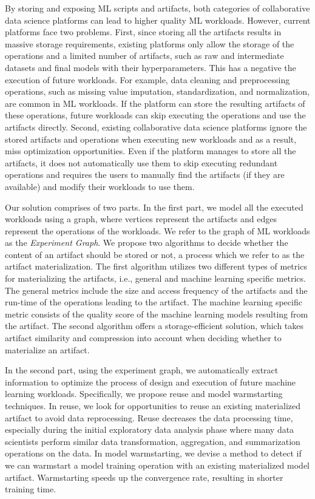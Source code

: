 By storing and exposing ML scripts and artifacts, both categories of collaborative data science platforms can lead to higher quality ML workloads.
However, current platforms face two problems.
First, since storing all the artifacts results in massive storage requirements, existing platforms only allow the storage of the operations and a limited number of artifacts, such as raw and intermediate datasets and final models with their hyperparameters.
This has a negative the execution of future workloads.
For example, data cleaning and preprocessing operations, such as missing value imputation, standardization, and normalization, are common in ML workloads.
If the platform can store the resulting artifacts of these operations, future workloads can skip executing the operations and use the artifacts directly. 
Second, existing collaborative data science platforms ignore the stored artifacts and operations when executing new workloads and as a result, miss optimization opportunities.
Even if the platform manages to store all the artifacts, it does not automatically use them to skip executing redundant operations and requires the users to manually find the artifacts (if they are available) and modify their workloads to use them.

Our solution comprises of two parts.
In the first part, we model all the executed workloads using a graph, where vertices represent the artifacts and edges represent the operations of the workloads.
We refer to the graph of ML workloads as the \textit{Experiment Graph}.
We propose two algorithms to decide whether the content of an artifact should be stored or not, a process which we refer to as the artifact materialization.
The first algorithm utilizes two different types of metrics for materializing the artifacts, i.e., general and machine learning specific metrics.
The general metrics include the size and access frequency of the artifacts and the run-time of the operations leading to the artifact.
The machine learning specific metric consists of the quality score of the machine learning models resulting from the artifact.
The second algorithm offers a storage-efficient solution, which takes artifact similarity and compression into account when deciding whether to materialize an artifact.

In the second part, using the experiment graph, we automatically extract information to optimize the process of design and execution of future machine learning workloads.
Specifically, we propose reuse and model warmstarting techniques.
In reuse, we look for opportunities to reuse an existing materialized artifact to avoid data reprocessing.
Reuse decreases the data processing time, especially during the initial exploratory data analysis phase where many data scientists perform similar data transformation, aggregation, and summarization operations on the data.
In model warmstarting, we devise a method to detect if we can warmstart a model training operation with an existing materialized model artifact.
Warmstarting speeds up the convergence rate, resulting in shorter training time. 

